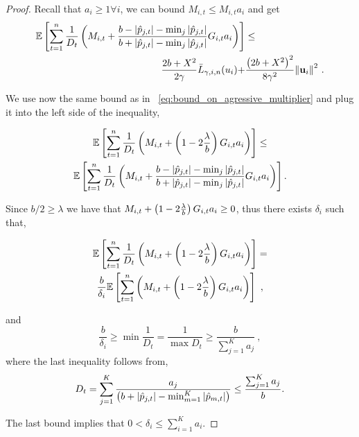 {\begin{proof}
\noindent
Recall that $a_{i} \ge 1 \forall i$, we can bound $M_{i,t} \le M_{i,t}a_{i}$ and get 
\begin{equation}
\begin{split}
\mathbb{E}\left[ \sum_{t=1}^{n}{\frac{1}{D_{t}}}\left({M_{i,t}+\frac{b-\left\vert{\hat{p}_{j,t}}\right\vert-\min_{j}{\left\vert{\hat{p}_{j,t}}\right\vert }}{b+\left\vert{\hat{p}_{j,t}}\right\vert-\min_{j}{\left\vert{\hat{p}_{j,t}}\right\vert}}G_{i,t}a_{i} }\right) \right]
&\le \\ \frac{2b+X^2}{2\gamma}{\bar
  L}_{\gamma,i,n}(u_i)+&\frac{\left({2b+X^2}\right)^2}{8{\gamma}^2}{\left\Vert
    \mathbf{u}_{i} \right\Vert}^2~.
\label{eq:step_3_in_proof_prior}
\end{split}
\end{equation}

\noindent
We use now the same bound as in ~\eqref{eq:bound_on_agressive_multiplier}
and plug it into the left side of the inequality,

\begin{multline*}
\mathbb{E}\left[{\sum_{t=1}^{n}{\frac{1}{D_{t}}}\left({M_{i,t}+\left({1-2\frac{\lambda}{b}}\right)G_{i,t}a_{i} }\right)}\right]
\le \\
\mathbb{E}\left[ \sum_{t=1}^{n}{\frac{1}{D_{t}}}\left({M_{i,t}+\frac{b-\left\vert{\hat{p}_{j,t}}\right\vert-\min_{j}{\left\vert{\hat{p}_{j,t}}\right\vert }}{b+\left\vert{\hat{p}_{j,t}}\right\vert-\min_{j}{\left\vert{\hat{p}_{j,t}}\right\vert}}G_{i,t}a_{i} }\right) \right].
\end{multline*}

\noindent
Since $b/2 \geq \lambda$ we have that
$M_{i,t}+\left({1-2\frac{\lambda}{b}}\right)G_{i,t}a_{i}\geq 0$, thus there
exists $\delta_i$ such that, 

\begin{multline}
  \label{eq:bound_delta_prior}
\mathbb{E}\left[
  \sum_{t=1}^{n}{\frac{1}{D_{t}}}\left({M_{i,t}+\left({1-2\frac{\lambda}{b}}\right)G_{i,t}a_{i}
  }\right) \right]= \\
  \frac{b}{\delta_i}\mathbb{E}\left[
  \sum_{t=1}^{n}\left({M_{i,t}+\left({1-2\frac{\lambda}{b}}\right)G_{i,t}a_{i}
  }\right) \right] ~,
\end{multline}

\noindent
and 
\[
\frac{b}{\delta_i} \geq \min\frac{1}{D_t}  = \frac{1}{\max D_t}  \geq \frac{b}{\sum_{j=1}^Ka_{j}}~,
\]
where the last inequality follows from,
\begin{equation*}
D_{t}=\sum_{j=1}^K\frac{a_{j}}{\left({b+\left\vert{\hat{p}_{j,t}}\right\vert-\min_{m=1}^K\left\vert{\hat{p}_{m,t}}\right\vert}\right)}\le \frac{\sum_{j=1}^Ka_{j}}{b}.
\end{equation*}

\noindent
The last bound implies that $0<\delta_i\le\sum_{i=1}^Ka_{i  }$.


\end{proof}}

